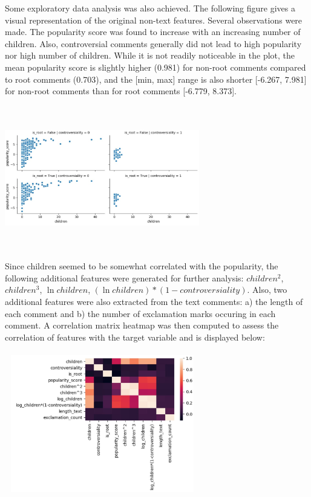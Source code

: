 \documentclass[11pt]{article}
\begin{document}
Some exploratory data analysis was also achieved. The following figure gives a visual representation of the original non-text features. Several observations were made. The popularity score was found to increase with an increasing number of children. Also, controversial comments generally did not lead to high popularity nor high number of children. While it is not readily noticeable in the plot, the mean popularity score is slightly higher (0.981) for non-root comments compared to root comments (0.703), and the [min, max] range is also shorter [-6.267, 7.981] for non-root comments than for root comments [-6.779, 8.373]. \\
\\
\includegraphics[width=8.5cm, height=6cm]{EDA-1}\\
\\
Since children seemed to be somewhat correlated with the popularity, the following additional features were generated for further analysis: $children^{2}$, $children^{3}$, $ \ln children$, $(\ln children)*(1-controversiality)$. Also, two additional features were also extracted from the text comments: a) the length of each comment and b) the number of exclamation marks occuring in each comment. A correlation matrix heatmap was then computed to assess the correlation of features with the target variable and is displayed below: \\
\\
\includegraphics[width=8.5cm, height=6cm]{EDA-4}\\
\end{document}
